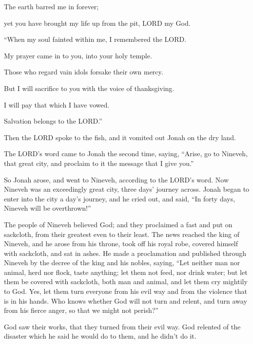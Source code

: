 The earth barred me in forever;

yet you have brought my life up from the pit, LORD my God.


\vspace{\baselineskip} \myverse{}“When my soul fainted within me, I remembered the LORD.

My prayer came in to you, into your holy temple.

\myverse{}Those who regard vain idols forsake their own mercy.

\myverse{}But I will sacrifice to you with the voice of thanksgiving.



\noindent I will pay that which I have vowed.

Salvation belongs to the LORD.”

\myverse{}Then the LORD spoke to the fish, and it vomited out Jonah on
the dry land.


\mychapter{} \myverse*{}The LORD’s word came to Jonah the second time, saying,
\myverse{}“Arise, go to Nineveh, that great city, and proclaim to it the message that
I give you.”

\myverse{}So Jonah arose, and went to Nineveh, according to the LORD’s word.
Now Nineveh was an exceedingly great city, three days’ journey across.
\myverse{}Jonah began to enter into the city a day’s journey, and he cried out, and said,
“In forty days, Nineveh will be overthrown!”

\myverse{}The people of Nineveh believed God; and they proclaimed a fast
and put on sackcloth, from their greatest even to their least.
\myverse{}The news reached the king of Nineveh, and he arose from his throne, took off
his royal robe, covered himself with sackcloth, and sat in ashes.
\myverse{}He made a proclamation and published through Nineveh by the decree of the king
and his nobles, saying, “Let neither man nor animal, herd nor flock, taste anything; let them not feed,
nor drink water;
\myverse{}but let them be covered with sackcloth, both man and animal, and let them cry
mightily to God. Yes, let them turn everyone from his evil way and from the violence that is in his hands.
\myverse{}Who knows whether God will not turn and relent, and turn away from his fierce
anger, so that we might not perish?”

\myverse{}God saw their works, that they turned from their evil way. God
relented of the disaster which he said he would do to them, and he didn’t do it.


